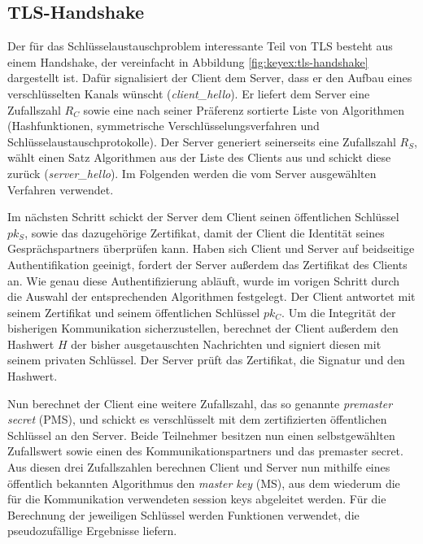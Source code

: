 \subsection{TLS-Handshake}
Der für das Schlüsselaustauschproblem interessante Teil von TLS besteht aus einem Handshake, der vereinfacht in Abbildung \ref{fig:keyex:tls-handshake}
dargestellt ist.
Dafür signalisiert der Client dem Server, dass er den Aufbau eines verschlüsselten Kanals wünscht (\emph{client\_hello}). Er liefert
dem Server eine Zufallszahl $R_C$ sowie eine nach seiner Präferenz sortierte Liste von Algorithmen (Hashfunktionen, symmetrische
Verschlüsselungsverfahren und Schlüsselaustauschprotokolle). Der Server generiert seinerseits eine Zufallszahl $R_S$, wählt einen Satz
Algorithmen aus der Liste des Clients aus und schickt diese zurück (\emph{server\_hello}). Im Folgenden werden die vom Server ausgewählten
Verfahren verwendet.

Im nächsten Schritt schickt der Server dem Client seinen öffentlichen Schlüssel $pk_S$, sowie das dazugehörige Zertifikat, damit der Client die Identität seines
Gesprächspartners überprüfen kann. Haben sich Client und Server auf beidseitige Authentifikation geeinigt, fordert der Server außerdem das Zertifikat des
Clients an.
Wie genau diese Authentifizierung abläuft, wurde im vorigen Schritt durch die Auswahl der entsprechenden Algorithmen festgelegt. Der Client antwortet mit
seinem Zertifikat und seinem öffentlichen Schlüssel $pk_C$. Um die Integrität der bisherigen Kommunikation sicherzustellen, berechnet der Client außerdem den Hashwert $H$
der bisher ausgetauschten Nachrichten und signiert diesen mit seinem privaten Schlüssel. Der Server prüft das Zertifikat, die Signatur und den Hashwert.

Nun berechnet der Client eine weitere Zufallszahl, das so genannte \emph{premaster secret} (PMS), und schickt es verschlüsselt mit dem
zertifizierten öffentlichen Schlüssel an den Server. Beide Teilnehmer besitzen nun einen selbstgewählten Zufallswert sowie einen des
Kommunikationspartners und das premaster secret. Aus diesen drei Zufallszahlen berechnen Client und Server nun mithilfe eines öffentlich bekannten
Algorithmus den \emph{master key} (MS), aus dem wiederum die für die Kommunikation verwendeten session keys abgeleitet werden.
Für die Berechnung der jeweiligen Schlüssel werden Funktionen verwendet, die pseudozufällige Ergebnisse liefern.

